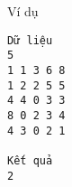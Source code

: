 Ví dụ
\begin{verbatim}
Dữ liệu
5
1 1 3 6 8
1 2 2 5 5
4 4 0 3 3
8 0 2 3 4
4 3 0 2 1

Kết quả
2
\end{verbatim}